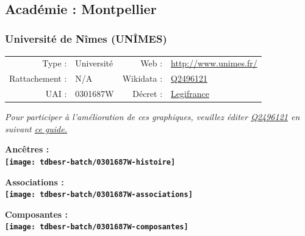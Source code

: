 \documentclass[12pt,french,]{article}
\begin{document}
\ifoddpage ~\newpage \fi   

\hypertarget{acaduxe9mie-montpellier}{%
\subsection{Académie : Montpellier}\label{acaduxe9mie-montpellier}}

\hypertarget{universituxe9-de-nuxeemes-unuxeemes}{%
\subsubsection{Université de Nîmes
(UNÎMES)}\label{universituxe9-de-nuxeemes-unuxeemes}}

\begin{tabular*}{\textwidth}{rp{5cm}rl}  
\hline  
Type : & Université & Web : &\href{http://www.unimes.fr/}{http://www.unimes.fr/} \\  
Rattachement : & N/A & Wikidata : & \href{https://www.wikidata.org/entity/Q2496121}{Q2496121} \\  
UAI : & 0301687W & Décret : & \href{http://www.legifrance.gouv.fr/affichTexte.do;jsessionid=3976DDB631865D070704985BB39F3EC7.tpdjo05v_1?cidTexte=JORFTEXT000025790064&categorieLien=id}{Legifrance} \\  
\hline  
\end{tabular*}

\textit{\scriptsize Pour participer à l'amélioration de ces graphiques, veuillez éditer  \href{https://www.wikidata.org/entity/Q2496121}{Q2496121}  en suivant \href{https://github.com/cpesr/wikidataESR/blob/master/Rmd/wikidataESR.md}{ce guide.}}

\vspace{1cm}  
\begin{minipage}[b]{0.50\textwidth}\begin{center} \bf Ancêtres : \\  
\texttt{[image: tdbesr-batch/0301687W-histoire]} \end{center}\end{minipage}\begin{minipage}[b]{0.50\textwidth}\begin{center} \bf Associations : \\  
\texttt{[image: tdbesr-batch/0301687W-associations]} \end{center}\end{minipage}

\hrulefill

\begin{center} \bf Composantes : \\  
\texttt{[image: tdbesr-batch/0301687W-composantes]} \end{center}
\end{document}
